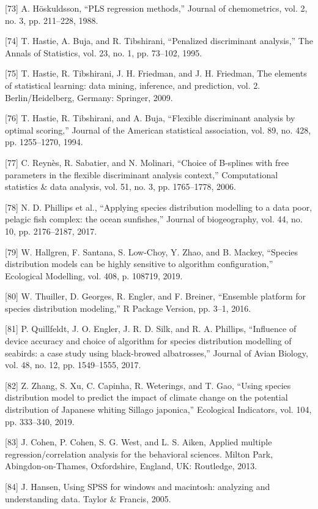\documentclass[sn-mathphys-num]{sn-jnl}%
\begin{document}
[73] A. Höskuldsson, “PLS regression methods,” Journal of chemometrics, vol. 2, no. 3, pp. 211–228, 1988.

[74] T. Hastie, A. Buja, and R. Tibshirani, “Penalized discriminant analysis,” The Annals of Statistics, vol. 23, no. 1, pp. 73–102, 1995.

[75] T. Hastie, R. Tibshirani, J. H. Friedman, and J. H. Friedman, The elements of statistical learning: data mining, inference, and prediction, vol. 2. Berlin/Heidelberg, Germany: Springer, 2009.

[76] T. Hastie, R. Tibshirani, and A. Buja, “Flexible discriminant analysis by optimal scoring,” Journal of the American statistical association, vol. 89, no. 428, pp. 1255–1270, 1994.

[77] C. Reynès, R. Sabatier, and N. Molinari, “Choice of B-splines with free parameters in the flexible discriminant analysis context,” Computational statistics & data analysis, vol. 51, no. 3, pp. 1765–1778, 2006.

[78] N. D. Phillips et al., “Applying species distribution modelling to a data poor, pelagic fish complex: the ocean sunfishes,” Journal of biogeography, vol. 44, no. 10, pp. 2176–2187, 2017.

[79] W. Hallgren, F. Santana, S. Low-Choy, Y. Zhao, and B. Mackey, “Species distribution models can be highly sensitive to algorithm configuration,” Ecological Modelling, vol. 408, p. 108719, 2019.

[80] W. Thuiller, D. Georges, R. Engler, and F. Breiner, “Ensemble platform for species distribution modeling,” R Package Version, pp. 3–1, 2016.

[81] P. Quillfeldt, J. O. Engler, J. R. D. Silk, and R. A. Phillips, “Influence of device accuracy and choice of algorithm for species distribution modelling of seabirds: a case study using black-browed albatrosses,” Journal of Avian Biology, vol. 48, no. 12, pp. 1549–1555, 2017.

[82] Z. Zhang, S. Xu, C. Capinha, R. Weterings, and T. Gao, “Using species distribution model to predict the impact of climate change on the potential distribution of Japanese whiting Sillago japonica,” Ecological Indicators, vol. 104, pp. 333–340, 2019.

[83] J. Cohen, P. Cohen, S. G. West, and L. S. Aiken, Applied multiple regression/correlation analysis for the behavioral sciences. Milton Park, Abingdon-on-Thames, Oxfordshire, England, UK: Routledge, 2013.

[84] J. Hansen, Using SPSS for windows and macintosh: analyzing and understanding data. Taylor & Francis, 2005.
\end{document}
